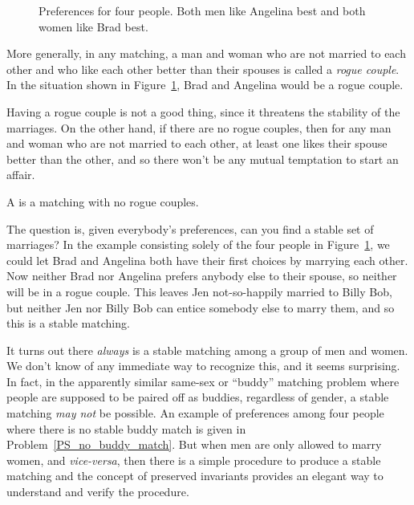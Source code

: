 \begin{figure}


\caption{Preferences for four people.  Both men like Angelina best and
both women like Brad best.}
\label{fig:minWtMatch2}
\end{figure}

More generally, in any matching, a man and woman who are not married
to each other and who like each other better than their spouses is
called a \emph{rogue couple}.  In the situation shown in
Figure~\ref{fig:minWtMatch2}, Brad and Angelina would be a rogue
couple.

Having a rogue couple is not a good thing, since it threatens the
stability of the marriages.  On the other hand, if there are no rogue
couples, then for any man and woman who are not married to each other,
at least one likes their spouse better than the other, and so there
won't be any mutual temptation to start an affair.

\begin{definition}
  A  is a matching with no rogue couples.
\end{definition}

The question is, given everybody's preferences, can you find a stable
set of marriages?  In the example consisting solely of the four people
in Figure~\ref{fig:minWtMatch2}, we could let Brad and Angelina both
have their first choices by marrying each other.  Now neither Brad nor
Angelina prefers anybody else to their spouse, so neither will be in a
rogue couple.  This leaves Jen not-so-happily married to Billy Bob,
but neither Jen nor Billy Bob can entice somebody else to marry them,
and so this is a stable matching.

It turns out there \emph{always} is a stable matching among a group of
men and women.  We don't know of any immediate way to recognize this,
and it seems surprising.  In fact, in the apparently similar same-sex
or ``buddy'' matching problem where people are supposed to be paired
off as buddies, regardless of gender, a stable matching \emph{may not}
be possible.  An example of preferences among four people where there
is no stable buddy match is given in Problem~\ref{PS_no_buddy_match}.
But when men are only allowed to marry women, and \emph{vice-versa},
then there is a simple procedure to produce a stable matching and the
concept of preserved invariants provides an elegant way to understand
and verify the procedure.

